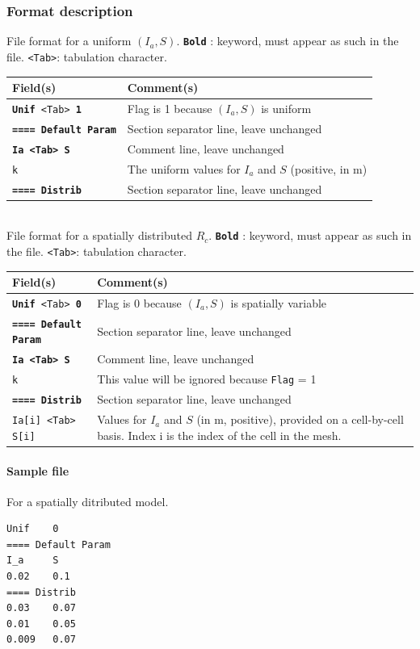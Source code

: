 \subsubsection{Format description}
File format for a uniform $(I_a, S)$.  
\texttt{\textbf{Bold}} : keyword, must appear as such in the file. \texttt{<Tab>}: tabulation character. \\
    \begin{tabular}{p{6cm} | p{9cm}}
    \hline
    Field(s) & Comment(s) \\
    \hline  \hline
    \texttt{\textbf{Unif} <Tab> \textbf{1}} & Flag is 1 because $(I_a, S)$ is uniform \\ 
    \hline
    \texttt{\textbf{==== Default Param}} & Section separator line, leave unchanged \\
    \hline
    \texttt{\textbf{Ia <Tab> S}} & Comment line, leave unchanged \\  
    \hline
    \texttt{k} & The uniform values for $I_a$ and $S$ (positive, in m) \\ 
    \hline
    \texttt{\textbf{==== Distrib}} & Section separator line, leave unchanged \\  
    \hline
    \end{tabular}
%
\vspace{10mm} \\
%
File format for a spatially distributed $R_c$.  
\texttt{\textbf{Bold}} : keyword, must appear as such in the file. \texttt{<Tab>}: tabulation character. \\
    \begin{tabular}{p{6cm} | p{9cm}}
    \hline
    Field(s) & Comment(s) \\
    \hline  \hline
    \texttt{\textbf{Unif} <Tab> \textbf{0}} & Flag is 0 because $(I_a, S)$ is spatially variable \\ 
    \hline
    \texttt{\textbf{==== Default Param}} & Section separator line, leave unchanged \\ 
    \hline
    \texttt{\textbf{Ia <Tab> S}} & Comment line, leave unchanged \\ 
    \hline
    \texttt{k}     & This value will be ignored because \texttt{Flag} = 1 \\ 
    \hline
    \texttt{\textbf{==== Distrib}} & Section separator line, leave unchanged \\  
    \hline
    \texttt{Ia[i] <Tab> S[i]}      & Values for $I_a$ and $S$ (in m, positive), provided on a cell-by-cell basis. Index i is the index of the cell in the mesh.  \\ 
    \hline
    \end{tabular}

\paragraph*{Sample file}
For a spatially ditributed model.

\begin{verbatim}
Unif	0
==== Default Param
I_a		S  
0.02	0.1
==== Distrib
0.03	0.07
0.01	0.05
0.009	0.07
\end{verbatim}